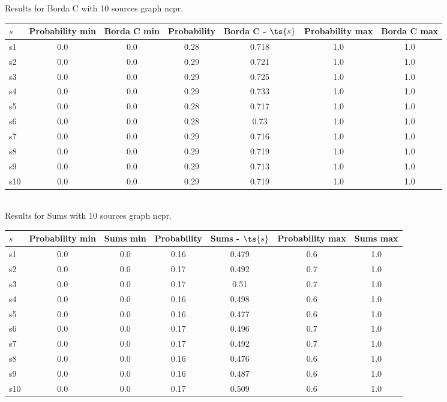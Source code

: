 \documentclass{article}
\begin{document}
\noindent Results for Borda C with 10 sources graph ncpr.

\noindent\begin{tabular}{|l|c|c|c|c|c|c|}
\hline
$s$& Probability min & Borda C min & Probability & Borda C - $\ts{s}$ & Probability max & Borda C max\\
\hline
s1 &0.0 & 0.0 & 0.28 & 0.718 & 1.0 & 1.0\\
\hline
s2 &0.0 & 0.0 & 0.29 & 0.721 & 1.0 & 1.0\\
\hline
s3 &0.0 & 0.0 & 0.29 & 0.725 & 1.0 & 1.0\\
\hline
s4 &0.0 & 0.0 & 0.29 & 0.733 & 1.0 & 1.0\\
\hline
s5 &0.0 & 0.0 & 0.28 & 0.717 & 1.0 & 1.0\\
\hline
s6 &0.0 & 0.0 & 0.28 & 0.73 & 1.0 & 1.0\\
\hline
s7 &0.0 & 0.0 & 0.29 & 0.716 & 1.0 & 1.0\\
\hline
s8 &0.0 & 0.0 & 0.29 & 0.719 & 1.0 & 1.0\\
\hline
s9 &0.0 & 0.0 & 0.29 & 0.713 & 1.0 & 1.0\\
\hline
s10 &0.0 & 0.0 & 0.29 & 0.719 & 1.0 & 1.0\\
\hline
\end{tabular}\\

\noindent Results for Sums with 10 sources graph ncpr.

\noindent\begin{tabular}{|l|c|c|c|c|c|c|}
\hline
$s$& Probability min & Sums min & Probability & Sums - $\ts{s}$ & Probability max & Sums max\\
\hline
s1 &0.0 & 0.0 & 0.16 & 0.479 & 0.6 & 1.0\\
\hline
s2 &0.0 & 0.0 & 0.17 & 0.492 & 0.7 & 1.0\\
\hline
s3 &0.0 & 0.0 & 0.17 & 0.51 & 0.7 & 1.0\\
\hline
s4 &0.0 & 0.0 & 0.16 & 0.498 & 0.6 & 1.0\\
\hline
s5 &0.0 & 0.0 & 0.16 & 0.477 & 0.6 & 1.0\\
\hline
s6 &0.0 & 0.0 & 0.17 & 0.496 & 0.7 & 1.0\\
\hline
s7 &0.0 & 0.0 & 0.17 & 0.492 & 0.7 & 1.0\\
\hline
s8 &0.0 & 0.0 & 0.16 & 0.476 & 0.6 & 1.0\\
\hline
s9 &0.0 & 0.0 & 0.16 & 0.487 & 0.6 & 1.0\\
\hline
s10 &0.0 & 0.0 & 0.17 & 0.509 & 0.6 & 1.0\\
\hline
\end{tabular}\\
\end{document}
